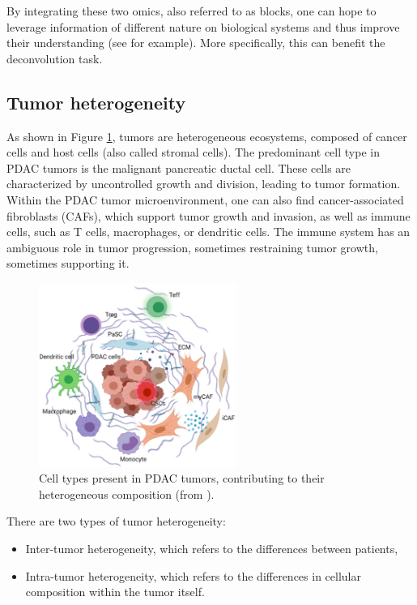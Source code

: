 \documentclass{article}
\begin{document}
By integrating these two omics, also referred to as blocks, one can hope to leverage information of different nature on biological systems and thus improve their understanding (see \cite{ebrahim_2016_multi} for example).
More specifically, this can benefit the deconvolution task.

\subsection{Tumor heterogeneity}\label{subsec:tumor-heterogeneity}

As shown in Figure \ref{fig:pdac_tumor}, tumors are heterogeneous ecosystems, composed of cancer cells and host cells (also called stromal cells).
The predominant cell type in PDAC tumors is the malignant pancreatic ductal cell.
These cells are characterized by uncontrolled growth and division, leading to tumor formation.
Within the PDAC tumor microenvironment, one can also find cancer-associated fibroblasts (CAFs), which support tumor growth and invasion, as well as immune cells, such as T cells, macrophages, or dendritic cells. The immune system has an ambiguous role in tumor progression, sometimes restraining tumor growth, sometimes supporting it.

\begin{figure}[ht]
    \centering
    \includegraphics[height=6cm,width=\textwidth,keepaspectratio]{fig/pdac_tumor.png}
    \caption{Cell types present in PDAC tumors, contributing to their heterogeneous composition (from \cite{truong_2021_pancreatic}).}
    \label{fig:pdac_tumor}
\end{figure}

There are two types of tumor heterogeneity:
\begin{itemize}
    \item Inter-tumor heterogeneity, which refers to the differences between patients,
    \item Intra-tumor heterogeneity, which refers to the differences in cellular composition within the tumor itself.
\end{itemize}
\end{document}
